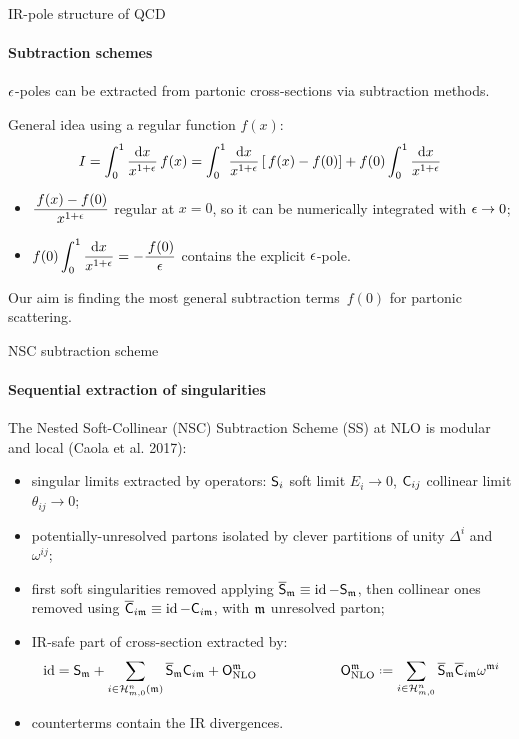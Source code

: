 
\begin{frame}{IR-pole structure of QCD}
  \framesubtitle{Subtraction schemes}

  $ \epsilon $-poles can be extracted from partonic cross-sections via subtraction methods.

  General idea using a regular function $ f(x) $:
  \begin{equation*}
    I = \int_0^1 \frac{\mathrm{d} x}{x^{1 + \epsilon}} \,f(x) = \int_0^1 \frac{\mathrm{d} x}{x^{1 + \epsilon}} \left[ \,f(x) - f(0) \right] + f(0) \int_0^1 \frac{\mathrm{d} x}{x^{1 + \epsilon}}
  \end{equation*}
  \begin{itemize}
    \item $ \displaystyle \frac{\,f(x) - f(0)}{x^{1 + \epsilon}} $ regular at $ x = 0 $, so it can be numerically integrated with $ \epsilon \rightarrow 0 $;
    \item $ \displaystyle f(0) \int_0^1 \frac{\mathrm{d} x}{x^{1 + \epsilon}} = - \frac{\,f(0)}{\epsilon} $ contains the explicit $ \epsilon $-pole.
  \end{itemize}

  Our aim is finding the most general subtraction terms $ \,f(0) $ for partonic scattering.

\end{frame}


\begin{frame}{NSC subtraction scheme}
  \framesubtitle{Sequential extraction of singularities}

  \justifying
  The Nested Soft-Collinear (NSC) Subtraction Scheme (SS) at NLO is modular and local (Caola et al. 2017):
  \begin{itemize}[<+->]
    \item singular limits extracted by operators: $ \mathsf{S}_i $ soft limit $ E_i \rightarrow 0 $, $ \mathsf{C}_{ij} $ collinear limit $ \theta_{ij} \rightarrow 0 $;
    \item potentially-unresolved partons isolated by clever partitions of unity $ \Delta^i $ and $ \omega^{ij} $;
    \item first soft singularities removed applying $ \overline{\mathsf{S}}_{\mathfrak{m}} \equiv \operatorname{id} - \mathsf{S}_{\mathfrak{m}} $, then collinear ones removed using $ \overline{\mathsf{C}}_{i\mathfrak{m}} \equiv \operatorname{id} - \mathsf{C}_{i\mathfrak{m}} $, with $ \mathfrak{m} $ unresolved parton;
    \item IR-safe part of cross-section extracted by:
      \begin{equation*}
        \id = \so_\ur + \sum_{i \in \prt{n}{m}(\ur)} \oso_\ur \co_{i\ur} + \nlo^\ur
        \qquad \qquad \qquad
        \nlo^\ur \defeq \sum_{i \in \prt{n}{m}} \oso_\ur \oco_{i\ur} \omega^{\ur i}
      \end{equation*}
    \item counterterms contain the IR divergences.
  \end{itemize}

\end{frame}

